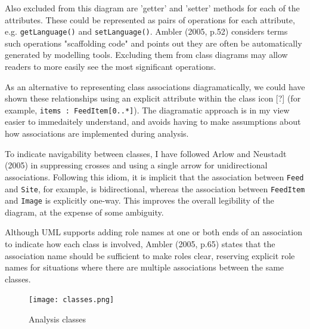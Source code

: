 \documentclass{article}
\begin{document}
Also excluded from this diagram are 'getter' and 'setter' methods for each of the attributes. These could be represented as pairs of operations for each attribute, e.g. \texttt{getLanguage()} and \texttt{setLanguage()}. Ambler (2005, p.52) considers terms such operations "scaffolding code" and points out they are often be automatically generated by modelling tools. Excluding them from class diagrams may allow readers to more easily see the most significant operations.

As an alternative to representing class associations diagramatically, we could have shown these relationships using an explicit attribute within the class icon [?] (for example, \texttt{items : FeedItem[0..*]}). The diagramatic approach is in my view easier to immedaitely understand, and avoids having to make assumptions about how associations are implemented during analysis.

To indicate navigability between classes, I have followed Arlow and Neustadt (2005) in suppressing crosses and using a single arrow for unidirectional associations. Following this idiom, it is implicit that the association between \texttt{Feed} and \texttt{Site}, for example, is bidirectional, whereas the association between \texttt{FeedItem} and \texttt{Image} is explicitly one-way. This improves the overall legibility of the diagram, at the expense of some ambiguity.

Although UML supports adding role names at one or both ends of an association to indicate how each class is involved, Ambler (2005, p.65) states that the association name should be sufficient to make roles clear, reserving explicit role names for situations where there are multiple associations between the same classes.




\begin{figure}
  \begin{center}
    \texttt{[image: classes.png]}
  \end{center}
  \label{analysis-classes}
  \caption{Analysis classes}
\end{figure}
\end{document}
